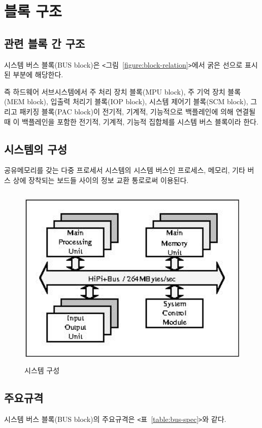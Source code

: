 \section{블록 구조}

\subsection{관련 블록 간 구조}
시스템 버스 블록(BUS block)은 {\tt <}그림~\ref{figure:block-relation}{\tt >}에서
굵은 선으로 표시된 부분에 해당한다.
%

%
즉 하드웨어 서브시스템에서 주 처리 장치 블록(MPU block),
주 기억 장치 블록(MEM block), 입출력 처리기 블록(IOP block), 시스템
제어기 블록(SCM block), 그리고 패키징 블록(PAC block)이 전기적, 기계적, 기능적으로
백플레인에 의해 연결될 때 이 백플레인을
포함한 전기적, 기계적, 기능적 집합체를 시스템 버스 블록이라 한다.

\subsection{시스템의 구성}
공유메모리를 갖는 다중 프로세서 시스템의 시스템 버스인 
프로세스, 메모리, 기타 버스 상에 장착되는 보드들 사이의 정보 교환 통로로써 이용된다.
%
\begin{figure}[htb]
    \centerline{\includegraphics[height=3.5in]{ch1/FIG/system.jpg}} %
   \caption{시스템 구성}\label{figure:system-config}
\end{figure}
%

\subsection{주요규격}
시스템 버스 블록(BUS block)의 주요규격은 {\tt <}표~\ref{table:bus-spec}{\tt >}와
같다.


